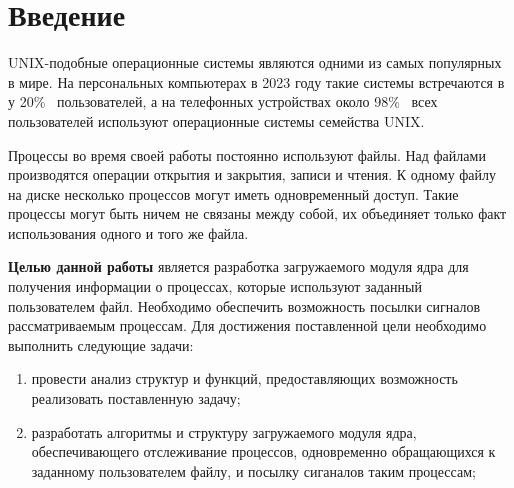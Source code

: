 \chapter*{Введение}

UNIX-подобные операционные системы являются одними из самых популярных в мире. 
На персональных компьютерах в 2023 году такие системы встречаются в у 20\%~\cite{pcstat} пользователей, а на телефонных устройствах около 98\%~\cite{phonestat} всех пользователей используют операционные системы семейства UNIX.

Процессы во время своей работы постоянно используют файлы. 
Над файлами производятся операции открытия и закрытия, записи и чтения. 
К одному файлу на диске несколько процессов могут иметь одновременный доступ.
Такие процессы могут быть ничем не связаны между собой, их объединяет только факт использования одного и того же файла.

\textbf{Целью данной работы} является разработка загружаемого модуля ядра для получения информации о процессах, которые используют заданный пользователем файл. Необходимо обеспечить возможность посылки сигналов рассматриваемым процессам.
Для достижения поставленной цели необходимо выполнить следующие задачи:
\begin{enumerate}[label=\arabic*)]
	\item провести анализ структур и функций, предоставляющих возможность реализовать поставленную задачу;
    \item разработать алгоритмы и структуру загружаемого модуля ядра, обеспечивающего отслеживание процессов, одновременно обращающихся к заданному пользователем файлу, и посылку сиганалов таким процессам;
\end{enumerate}
